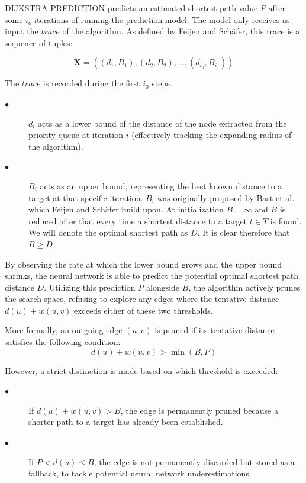 \textsc{DIJKSTRA-PREDICTION} predicts an estimated shortest path value $P$ after some $i_o$ iterations of running the prediction model.
The model only receives as input the $trace$ of the algorithm. As defined by Feijen and Schäfer\cite[Sec.~3.1]{feijenDijkstrasAlgorithmPredictions2023}, this trace is a sequence of tuples:

\begin{equation}
    \mathbf{X} = ((d_1, B_1), (d_2, B_2), \dots, (d_{i_0}, B_{i_0}))
\end{equation}

The $trace$ is recorded during the first $i_0$ steps.
\begin{description}
    \item[$\bullet$] \textbf{$d_i$} acts as a lower bound of the distance of the node extracted from the priority queue at iteration $i$ (effectively tracking the expanding radius of the algorithm).
    \item[$\bullet$] \textbf{$B_i$} acts as an upper bound, representing the best known distance to a target at that specific iteration. $B_i$ was originally proposed by Bast et al.\cite{bastHeuristicDijkstrasAlgorithm2003} which Feijen and Schäfer build upon. At initialization $B= \infty$ and $B$ is reduced after that every time a shortest distance to a target $t \in T$ is found. 
    We will denote the optimal shortest path as $D$. It is clear therefore that $B \ge D$
\end{description}

By observing the rate at which the lower bound grows and the upper bound shrinks, the neural network is able to predict the potential optimal shortest path distance $D$. Utilizing this prediction $P$ alongside $B$, the algorithm actively prunes the search space, refusing to explore any edges where the tentative distance $d(u) + w(u, v)$ exceeds either of these two thresholds. 

More formally, an outgoing edge $(u, v)$ is pruned if its tentative distance satisfies the following condition:
\begin{equation}
    d(u) + w(u, v) > \min(B, P)    
\end{equation}

However, a strict distinction is made based on which threshold is exceeded:
\begin{description}
    \item[$\bullet$] If $d(u) + w(u, v) > B$, the edge is permanently pruned because a shorter path to a target has already been established.
    \item[$\bullet$] If $P < d(u) \le B$, the edge is not permanently discarded but stored as a fallback, to tackle potential neural network underestimations.
\end{description}

